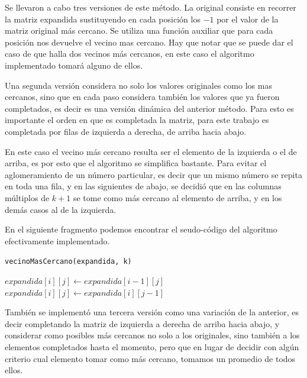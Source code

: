 \documentclass[a4paper]{article}
\newcounter{row}
\newcounter{col}
\begin{document}
Se llevaron a cabo tres versiones de este método. La original consiste en recorrer la matriz expandida sustituyendo en cada posición los $ -1 $ por el valor de la matriz original m\'as cercano. Se utiliza una función auxiliar que para cada posición nos devuelve el vecino mas cercano. Hay que notar que se puede dar el caso de que halla dos vecinos m\'as cercanos, en este caso el algoritmo implementado tomar\'a alguno de ellos.

Una segunda versión considera no solo los valores originales como los mas cercanos, sino que en cada paso considera también los valores que ya fueron completados, es decir es una versión dinámica del anterior método. Para esto es importante el orden en que es completada la matriz, para este trabajo es completada por filas de izquierda a derecha, de arriba hacia abajo.
 
 En este caso el vecino m\'as cercano resulta ser el elemento de la izquierda o el de arriba, es por esto que el algoritmo se simplifica bastante. Para evitar el aglomeramiento de un número particular, es decir que un mismo número se repita en toda una fila, y en las siguientes de abajo, se decidió que en las columnas múltiplos de $ k +1 $ se tome como m\'as cercano al elemento de arriba, y en los demás casos al de la izquierda.
 
 
 En el siguiente fragmento podemos encontrar el seudo-código del algoritmo efectivamente implementado.


\begin{algorithm}[H]
    \caption{\texttt{vecinoMasCercano(expandida, k)}}
\begin{algorithmic}[1]
  \For{$i \leftarrow [0:cantidad\_filas) $}
    \For{$j \leftarrow [0:cantidad\_columnas)$}
        		\State $expandida[i][j] \leftarrow expandida[i-1][j]$
          \Else
            \State $expandida[i][j] \leftarrow expandida[i][j-1]$
          \EndIf
       \EndIf
    \EndFor
  \EndFor
\end{algorithmic}
\end{algorithm}

También se implement\'o una tercera versión como una variación de la anterior, es decir completando la matriz de izquierda a derecha de arriba hacia abajo, y considerar como posibles m\'as cercanos no solo a los originales, sino también a los elementos completados hasta el momento, pero que en lugar de decidir con algún criterio cual elemento tomar como m\'as cercano, tomamos un promedio de todos ellos.
\end{document}
